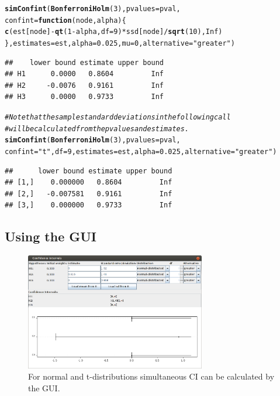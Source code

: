 \documentclass[a4paper, 10pt]{article}\usepackage[]{graphicx}\usepackage[]{color}
\makeatletter
\newcommand{\hlnum}[1]{\textcolor[rgb]{0.686,0.059,0.569}{#1}}%
\newcommand{\hlstr}[1]{\textcolor[rgb]{0.192,0.494,0.8}{#1}}%
\newcommand{\hlcom}[1]{\textcolor[rgb]{0.678,0.584,0.686}{\textit{#1}}}%
\newcommand{\hlopt}[1]{\textcolor[rgb]{0,0,0}{#1}}%
\newcommand{\hlstd}[1]{\textcolor[rgb]{0.345,0.345,0.345}{#1}}%
\newcommand{\hlkwa}[1]{\textcolor[rgb]{0.161,0.373,0.58}{\textbf{#1}}}%
\newcommand{\hlkwc}[1]{\textcolor[rgb]{0.333,0.667,0.333}{#1}}%
\newcommand{\hlkwd}[1]{\textcolor[rgb]{0.737,0.353,0.396}{\textbf{#1}}}%
\newenvironment{kframe}{%
 \def\at@end@of@kframe{}%
 \ifinner\ifhmode%
  \def\at@end@of@kframe{\end{minipage}}%
  \begin{minipage}{\columnwidth}%
 \fi\fi%
 \def\FrameCommand##1{\hskip\@totalleftmargin \hskip-\fboxsep
 \colorbox{shadecolor}{##1}\hskip-\fboxsep
     \hskip-\linewidth \hskip-\@totalleftmargin \hskip\columnwidth}%
 \MakeFramed {\advance\hsize-\width
   \@totalleftmargin\z@ \linewidth\hsize
   \@setminipage}}%
 {\par\unskip\endMakeFramed%
 \at@end@of@kframe}
\newenvironment{knitrout}{}{} %
\numberwithin{equation}{section}
\theoremstyle{definition}
\theoremstyle{plain}
\makeatother
\begin{document}
\begin{knitrout}
\begin{kframe}
\begin{alltt}
\hlkwd{simConfint}\hlstd{(}\hlkwd{BonferroniHolm}\hlstd{(}\hlnum{3}\hlstd{),} \hlkwc{pvalues}\hlstd{=pval,}
                \hlkwc{confint}\hlstd{=}\hlkwa{function}\hlstd{(}\hlkwc{node}\hlstd{,} \hlkwc{alpha}\hlstd{) \{}
                        \hlkwd{c}\hlstd{(est[node]}\hlopt{-}\hlkwd{qt}\hlstd{(}\hlnum{1}\hlopt{-}\hlstd{alpha,}\hlkwc{df}\hlstd{=}\hlnum{9}\hlstd{)}\hlopt{*}\hlstd{ssd[node]}\hlopt{/}\hlkwd{sqrt}\hlstd{(}\hlnum{10}\hlstd{),} \hlnum{Inf}\hlstd{)}
                \hlstd{\},} \hlkwc{estimates}\hlstd{=est,} \hlkwc{alpha}\hlstd{=}\hlnum{0.025}\hlstd{,} \hlkwc{mu}\hlstd{=}\hlnum{0}\hlstd{,} \hlkwc{alternative}\hlstd{=}\hlstr{"greater"}\hlstd{)}
\end{alltt}
\begin{verbatim}
##    lower bound estimate upper bound
## H1      0.0000   0.8604         Inf
## H2     -0.0076   0.9161         Inf
## H3      0.0000   0.9733         Inf
\end{verbatim}
\begin{alltt}
\hlcom{# Note that the sample standard deviations in the following call}
\hlcom{# will be calculated from the pvalues and estimates.}
\hlkwd{simConfint}\hlstd{(}\hlkwd{BonferroniHolm}\hlstd{(}\hlnum{3}\hlstd{),} \hlkwc{pvalues}\hlstd{=pval,}
                \hlkwc{confint}\hlstd{=}\hlstr{"t"}\hlstd{,} \hlkwc{df}\hlstd{=}\hlnum{9}\hlstd{,} \hlkwc{estimates}\hlstd{=est,} \hlkwc{alpha}\hlstd{=}\hlnum{0.025}\hlstd{,} \hlkwc{alternative}\hlstd{=}\hlstr{"greater"}\hlstd{)}
\end{alltt}
\begin{verbatim}
##      lower bound estimate upper bound
## [1,]    0.000000   0.8604         Inf
## [2,]   -0.007581   0.9161         Inf
## [3,]    0.000000   0.9733         Inf
\end{verbatim}
\end{kframe}
\end{knitrout}


\subsection{Using the GUI}

\begin{figure}[ht]
  \centering    
  \includegraphics[width=0.7\textwidth]{pictures/CIDialog.png}      
  \caption{\label{fig:CIDialog} For normal and t-distributions simultaneous CI can be calculated by the GUI.}
\end{figure}
\end{document}
